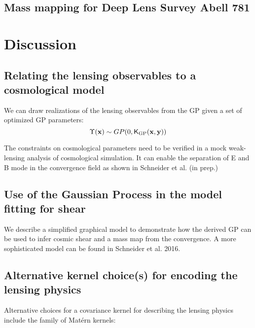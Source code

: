 \subsection{Mass mapping for Deep Lens Survey Abell 781}


\section{Discussion}

\subsection{Relating the lensing observables to a cosmological model}
We can draw realizations of the lensing observables from the GP given a set of
optimized GP parameters:
\begin{equation}
	\Upsilon(\mathbf{x}) \sim GP(0, \mathsf{K}_{\rm GP}(\mathbf{x}, \mathbf{y})) 
\end{equation}


The constraints on cosmological parameters need to be verified in a mock
weak-lensing analysis of cosmological simulation. 
It can enable the separation of E and B mode in the convergence field as shown
in Schneider et al. (in prep.) 

\subsection{Use of the Gaussian Process in the model fitting for shear}
We describe a simplified graphical model to demonstrate how the derived GP can
be used to infer cosmic shear and a mass map from the convergence.
A more sophisticated model can be found in Schneider et al. 2016.






\subsection{Alternative kernel choice(s) for encoding the lensing physics}
Alternative choices for a covariance kernel for describing the lensing physics 
include the family of Mat\'{e}rn kernels:
% 

